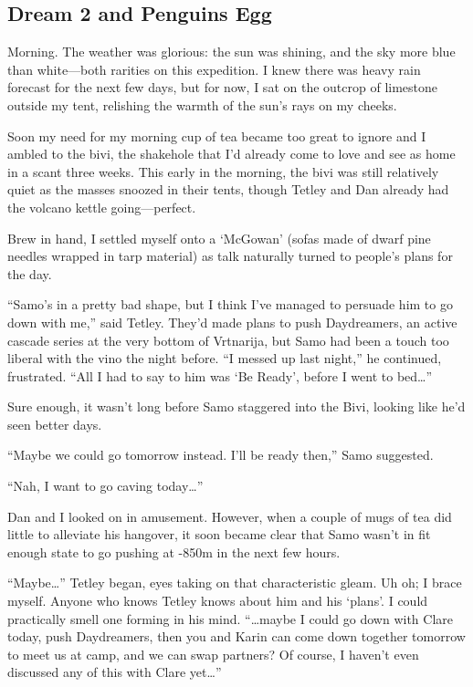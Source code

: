 
\subsection{Dream 2 and Penguins Egg}

Morning. The weather was glorious: the sun was shining, and the sky more
blue than white---both rarities on this expedition. I knew there was
heavy rain forecast for the next few days, but for now, I sat on the
outcrop of limestone outside my tent, relishing the warmth of the sun's
rays on my cheeks.

Soon my need for my morning cup of tea became too great to ignore and I
ambled to the bivi, the shakehole that I'd already come to love and see
as home in a scant three weeks. This early in the morning, the bivi was
still relatively quiet as the masses snoozed in their tents, though
Tetley and Dan already had the volcano kettle going---perfect.

Brew in hand, I settled myself onto a `McGowan' (sofas made of dwarf
pine needles wrapped in tarp material) as talk naturally turned to
people's plans for the day.

``Samo's in a pretty bad shape, but I think I've managed to persuade him
to go down with me,'' said Tetley. They'd made plans to push
Daydreamers, an active cascade series at the very bottom of Vrtnarija,
but Samo had been a touch too liberal with the vino the night before.
``I messed up last night,'' he continued, frustrated. ``All I had to say
to him was `Be Ready', before I went to bed\ldots{}''

Sure enough, it wasn't long before Samo staggered into the Bivi, looking
like he'd seen better days.

``Maybe we could go tomorrow instead. I'll be ready then,'' Samo
suggested.

``Nah, I want to go caving today\ldots{}''

Dan and I looked on in amusement. However, when a couple of mugs of tea
did little to alleviate his hangover, it soon became clear that Samo
wasn't in fit enough state to go pushing at -850m in the next few hours.

``Maybe\ldots{}'' Tetley began, eyes taking on that characteristic
gleam. Uh oh; I brace myself. Anyone who knows Tetley knows about him
and his `plans'. I could practically smell one forming in his mind.
``\ldots{}maybe I could go down with Clare today, push Daydreamers, then
you and Karin can come down together tomorrow to meet us at camp, and we
can swap partners? Of course, I haven't even discussed any of this with
Clare yet\ldots{}''

